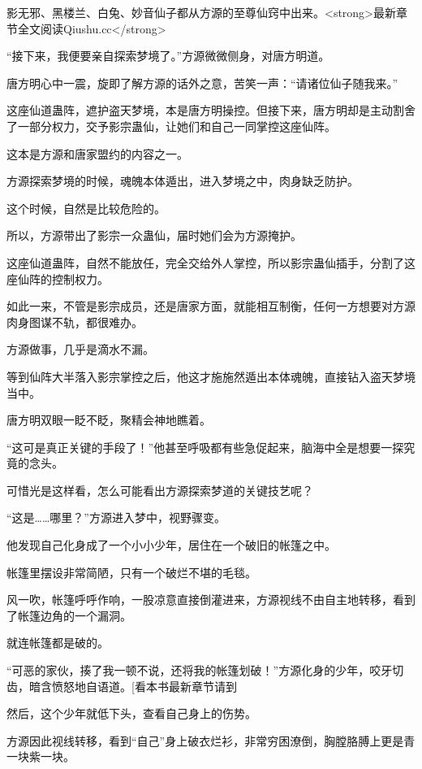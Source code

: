 
\begin{this_body}

影无邪、黑楼兰、白兔、妙音仙子都从方源的至尊仙窍中出来。<strong>最新章节全文阅读Qiushu.cc</strong>

“接下来，我便要亲自探索梦境了。”方源微微侧身，对唐方明道。

唐方明心中一震，旋即了解方源的话外之意，苦笑一声：“请诸位仙子随我来。”

这座仙道蛊阵，遮护盗天梦境，本是唐方明操控。但接下来，唐方明却是主动割舍了一部分权力，交予影宗蛊仙，让她们和自己一同掌控这座仙阵。

这本是方源和唐家盟约的内容之一。

方源探索梦境的时候，魂魄本体遁出，进入梦境之中，肉身缺乏防护。

这个时候，自然是比较危险的。

所以，方源带出了影宗一众蛊仙，届时她们会为方源掩护。

这座仙道蛊阵，自然不能放任，完全交给外人掌控，所以影宗蛊仙插手，分割了这座仙阵的控制权力。

如此一来，不管是影宗成员，还是唐家方面，就能相互制衡，任何一方想要对方源肉身图谋不轨，都很难办。

方源做事，几乎是滴水不漏。

等到仙阵大半落入影宗掌控之后，他这才施施然遁出本体魂魄，直接钻入盗天梦境当中。

唐方明双眼一眨不眨，聚精会神地瞧着。

“这可是真正关键的手段了！”他甚至呼吸都有些急促起来，脑海中全是想要一探究竟的念头。

可惜光是这样看，怎么可能看出方源探索梦道的关键技艺呢？

“这是……哪里？”方源进入梦中，视野骤变。

他发现自己化身成了一个小小少年，居住在一个破旧的帐篷之中。

帐篷里摆设非常简陋，只有一个破烂不堪的毛毯。

风一吹，帐篷呼呼作响，一股凉意直接倒灌进来，方源视线不由自主地转移，看到了帐篷边角的一个漏洞。

就连帐篷都是破的。

“可恶的家伙，揍了我一顿不说，还将我的帐篷划破！”方源化身的少年，咬牙切齿，暗含愤怒地自语道。[看本书最新章节请到

然后，这个少年就低下头，查看自己身上的伤势。

方源因此视线转移，看到“自己”身上破衣烂衫，非常穷困潦倒，胸膛胳膊上更是青一块紫一块。


\end{this_body}
